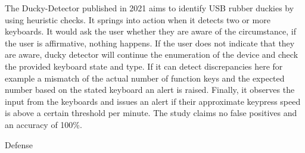 The Ducky-Detector \cite{USBRubberDucky2021} published in 2021 aims to identify USB rubber duckies by using heuristic checks. It springs into action when it detects two or more keyboards. It would ask the user whether they are aware of the circumstance, if the user is affirmative, nothing happens. If the user does not indicate that they are aware, ducky detector will continue the enumeration of the device and check the provided keyboard state and type. If it can detect discrepancies here for example a mismatch of the actual number of function keys and the expected number based on the stated keyboard an alert is raised. Finally, it observes the input from the keyboards and issues an alert if their approximate keypress speed is above a certain threshold per minute. The study claims no false positives and an accuracy of 100\%. 


Defense

